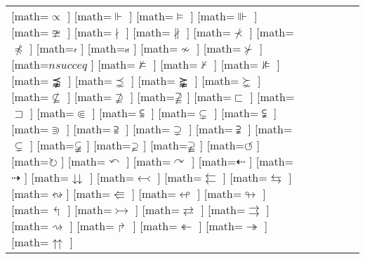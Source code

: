 \documentclass{unittest}
\begin{document}
\begin{tabular}{ll|ll|ll}
\makemath{}[math=$\varpropto$     ]
\makemath{⊩}[math=$\Vdash$         ]
\makemath{⊨}[math=$\vDash$         ]
\makemath{⊪}[math=$\Vvdash$        ]
\midrule%
\makemath{≇}[math=$\ncong$          ]
\makemath{∤}[math=$\nmid$           ]
\makemath{∦}[math=$\nparallel$      ]
\makemath{⊀}[math=$\nprec$          ]
\makemath{}[math=$\npreceq$        ]
\makemath{}[math=$\nshortmid$      ]
\makemath{}[math=$\nshortparallel$ ]
\makemath{≁}[math=$\nsim$           ]
\makemath{⊁}[math=$\nsucc$          ]
\makemath{}[math=$nsucceq$         ]
\makemath{⊭}[math=$\nvDash$         ]
\makemath{⊬}[math=$\nvdash$         ]
\makemath{⊯}[math=$\nVDash$         ]
\makemath{⪹}[math=$\precnapprox$    ]
\makemath{⋨}[math=$\precnsim$       ]
\makemath{⪺}[math=$\succnapprox$    ]
\makemath{⋩}[math=$\succnsim$       ]
\midrule%
\makemath{⊈}[math=$\nsubseteq$     ]
\makemath{⊉}[math=$\nsupseteq$     ]
\makemath{}[math=$\nsupseteqq$    ]
\makemath{⊏}[math=$\sqsubset$      ]
\makemath{⊐}[math=$\sqsupset$      ]
\makemath{⋐}[math=$\Subset$        ]
\makemath{⫅}[math=$\subseteqq$     ]
\makemath{⊊}[math=$\subsetneq$     ]
\makemath{⫋}[math=$\subsetneqq$    ]
\makemath{⋑}[math=$\Supset$        ]
\makemath{⫆}[math=$\supseteqq$     ]
\makemath{⊋}[math=$\supsetneq$     ]
\makemath{⫌}[math=$\supsetneqq$    ]
\makemath{}[math=$\varsubsetneq$  ]
\makemath{}[math=$\varsubsetneqq$ ]
\makemath{}[math=$\varsupsetneq$  ]
\makemath{}[math=$\varsupsetneqq$ ]
\midrule%
\makemath{⟲}[math=$\circlearrowleft$    ]
\makemath{⟳}[math=$\circlearrowright$   ]
\makemath{↶}[math=$\curvearrowleft$     ]
\makemath{↷}[math=$\curvearrowright$    ]
\makemath{⇠}[math=$\dashleftarrow$      ]
\makemath{⇢}[math=$\dashrightarrow$     ]
\makemath{⇊}[math=$\downdownarrows$     ]
\makemath{↢}[math=$\leftarrowtail$      ]
\makemath{⇇}[math=$\leftleftarrows$     ]
\makemath{⇆}[math=$\leftrightarrows$    ]
\makemath{↭}[math=$\leftrightsquigarrow$]
\makemath{⇚}[math=$\Lleftarrow$         ]
\makemath{↫}[math=$\looparrowleft$      ]
\makemath{↬}[math=$\looparrowright$     ]
\makemath{↰}[math=$\Lsh$                ]
\makemath{↣}[math=$\rightarrowtail$     ]
\makemath{⇄}[math=$\rightleftarrows$    ]
\makemath{⇒}[math=$\rightrightarrows$   ]
\makemath{⇝}[math=$\rightsquigarrow$    ]
\makemath{↱}[math=$\Rsh$                ]
\makemath{↞}[math=$\twoheadleftarrow$   ]
\makemath{↠}[math=$\twoheadrightarrow$  ]
\makemath{⇈}[math=$\upuparrows$         ]
\bottomrule
\end{tabular}
\end{document}
